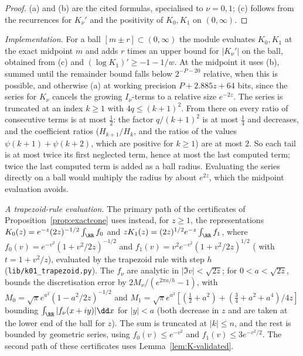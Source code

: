 \begin{proof}
(a) and (b) are the cited formulas, specialised to $\nu=0,1$; (c) follows from the recurrences for $K_\nu'$ and the
positivity of $K_0,K_1$ on $(0,\infty)$.
\end{proof}

\emph{Implementation.} For a ball $[m\pm r]\subset(0,\infty)$ the module evaluates $K_0,K_1$ at the exact midpoint $m$ and
adds $r$ times an upper bound for $|K_\nu'|$ on the ball, obtained from (c) and $(\log K_1)'\ge-1-1/w$. At the midpoint it
uses (b), summed until the remainder bound falls below $2^{-P-20}$ relative, when this is possible, and otherwise (a) at
working precision $P+2.885z+64$ bits, since the series for $K_\nu$ cancels the growing $I_\nu$-terms to a relative size
$e^{-2z}$. The series is truncated at an index $k\ge1$ with $4q\le(k+1)^2$. From there on every ratio of consecutive terms is at
most $\frac12$: the factor $q/(k+1)^2$ is at most $\frac14$ and decreases, and the coefficient ratios ($H_{k+1}/H_k$, and the ratios of the
values $\psi(k+1)+\psi(k+2)$, which are positive for $k\ge1$) are at most $2$. So each tail is at most twice its first neglected term,
hence at most the last computed term; twice the last computed term is added as a ball radius. Evaluating the series directly on a ball
would multiply the radius by about $e^{2z}$, which the midpoint evaluation avoids.

\emph{A trapezoid-rule evaluation.} The primary path of the certificates of Proposition~\ref{prop:exactcone} uses instead, for $z\ge1$,
the representations $K_0(z)=e^{-z}(2z)^{-1/2}\int_\RR f_0$ and $zK_1(z)=(2z)^{1/2}e^{-z}\int_\RR f_1$, where
$f_0(v)=e^{-v^2}(1+v^2/2z)^{-1/2}$ and $f_1(v)=v^2e^{-v^2}(1+v^2/2z)^{1/2}$ (\cite[10.32.8]{DLMF} with $t=1+v^2/z$), evaluated by the
trapezoid rule with step $h$ (\nolinkurl{lib/k01_trapezoid.py}). The $f_\nu$ are analytic in $|\Im v|<\sqrt{2z}$; for $0<a<\sqrt{2z}$,
\cite[Theorem~5.1]{TW14} bounds the discretisation error by $2M_\nu/(e^{2\pi a/h}-1)$, with $M_0=\sqrt\pi e^{a^2}(1-a^2/2z)^{-1/2}$ and
$M_1=\sqrt\pi e^{a^2}[(\frac12+a^2)+(\frac34+a^2+a^4)/4z]$ bounding $\int_\RR|f_\nu(x+iy)|\dd x$ for $|y|<a$ (both decrease in $z$ and are
taken at the lower end of the ball for $z$). The sum is truncated at $|k|\le n$, and the rest is bounded by geometric series, using
$f_0(v)\le e^{-v^2}$ and $f_1(v)\le3e^{-v^2/2}$. The second path of these certificates uses Lemma~\ref{lem:K-validated}.

